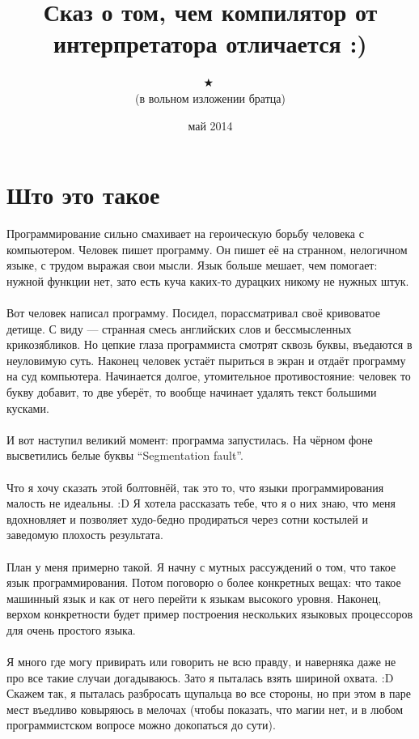 \documentclass[11pt]{book}
\title{
\small{\textleaf}
\huge{\textleaf}
\huge{\quad}
\large{Сказ о том, чем компилятор от интерпретатора отличается :)}
\huge{\quad}
\huge{\textleaf}
\small{\textleaf}
}
\author{
\small{\textborn} \ 
\small{\APLstar} \ 
\huge{\textborn} \ 
\huge{\APLstar} \ 
\Huge{$\bigstar$} \ 
\huge{\APLstar} \ 
\huge{\textborn} \ 
\small{\APLstar} \ 
\small{\textborn}
\\
\Large (в вольном изложении братца)
\\
\huge{\Bicycle}
}
\date{май 2014}
\begin{document}
\maketitle
\pagebreak

\section*{Што это такое}
Программирование сильно смахивает на героическую борьбу человека с компьютером.
Человек пишет программу. Он пишет её на странном, нелогичном языке, с трудом выражая
свои мысли. Язык больше мешает, чем помогает: нужной функции нет, зато есть
куча каких-то дурацких никому не нужных штук.
\\ \\
Вот человек написал программу. Посидел, порассматривал своё кривоватое детище.
С виду --- странная смесь английских слов и бессмысленных крикозябликов.
Но цепкие глаза программиста смотрят сквозь буквы, въедаются
в неуловимую суть. Наконец человек устаёт пыриться в экран и отдаёт программу
на суд компьютера. Начинается долгое, утомительное противостояние: человек
то букву добавит, то две уберёт, то вообще начинает удалять текст большими кусками.
\\ \\
И вот наступил великий момент: программа запустилась. На чёрном фоне
высветились белые буквы ``Segmentation fault''.
\\ \\
Что я хочу сказать этой болтовнёй, так это то, что языки программирования малость не идеальны. :D
Я хотела рассказать тебе, что я о них знаю, что меня вдохновляет
и позволяет худо-бедно продираться через сотни костылей и заведомую плохость результата.
\\ \\
План у меня примерно такой.
Я начну с мутных рассуждений о том, что такое язык программирования.
Потом поговорю о более конкретных вещах: что такое машинный язык и как от него перейти к языкам высокого уровня.
Наконец, верхом конкретности будет пример построения нескольких языковых процессоров для очень простого языка.
\\ \\
Я много где могу привирать или говорить не всю правду, и наверняка даже не про все такие случаи догадываюсь.
Зато я пыталась взять шириной охвата. :D
Скажем так, я пыталась разбросать щупальца во все стороны, но при этом в паре мест въедливо ковыряюсь в мелочах
(чтобы показать, что магии нет, и в любом программистском вопросе можно докопаться до сути).
\end{document}
